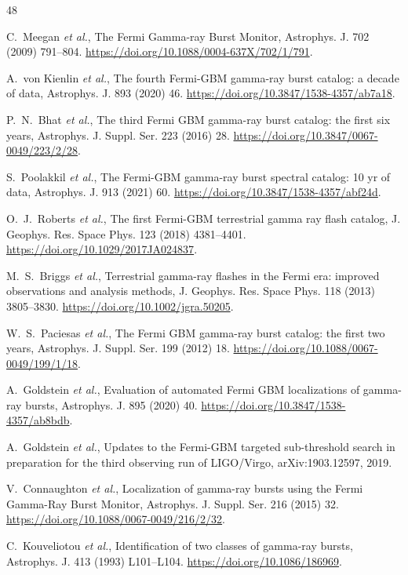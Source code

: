 \documentclass[preprint,12pt]{elsarticle}
\begin{document}

\begin{thebibliography}{48}

 C.~Meegan \textit{et al.}, The Fermi Gamma-ray Burst Monitor, Astrophys. J. 702 (2009) 791--804. \url{https://doi.org/10.1088/0004-637X/702/1/791}.

 A.~von Kienlin \textit{et al.}, The fourth Fermi-GBM gamma-ray burst catalog: a decade of data, Astrophys. J. 893 (2020) 46. \url{https://doi.org/10.3847/1538-4357/ab7a18}.

 P.~N.~Bhat \textit{et al.}, The third Fermi GBM gamma-ray burst catalog: the first six years, Astrophys. J. Suppl. Ser. 223 (2016) 28. \url{https://doi.org/10.3847/0067-0049/223/2/28}.

 S.~Poolakkil \textit{et al.}, The Fermi-GBM gamma-ray burst spectral catalog: 10 yr of data, Astrophys. J. 913 (2021) 60. \url{https://doi.org/10.3847/1538-4357/abf24d}.

 O.~J.~Roberts \textit{et al.}, The first Fermi-GBM terrestrial gamma ray flash catalog, J. Geophys. Res. Space Phys. 123 (2018) 4381--4401. \url{https://doi.org/10.1029/2017JA024837}.

 M.~S.~Briggs \textit{et al.}, Terrestrial gamma-ray flashes in the Fermi era: improved observations and analysis methods, J. Geophys. Res. Space Phys. 118 (2013) 3805--3830. \url{https://doi.org/10.1002/jgra.50205}.

 W.~S.~Paciesas \textit{et al.}, The Fermi GBM gamma-ray burst catalog: the first two years, Astrophys. J. Suppl. Ser. 199 (2012) 18. \url{https://doi.org/10.1088/0067-0049/199/1/18}.

 A.~Goldstein \textit{et al.}, Evaluation of automated Fermi GBM localizations of gamma-ray bursts, Astrophys. J. 895 (2020) 40. \url{https://doi.org/10.3847/1538-4357/ab8bdb}.

 A.~Goldstein \textit{et al.}, Updates to the Fermi-GBM targeted sub-threshold search in preparation for the third observing run of LIGO/Virgo, arXiv:1903.12597, 2019.

 V.~Connaughton \textit{et al.}, Localization of gamma-ray bursts using the Fermi Gamma-Ray Burst Monitor, Astrophys. J. Suppl. Ser. 216 (2015) 32. \url{https://doi.org/10.1088/0067-0049/216/2/32}.

 C.~Kouveliotou \textit{et al.}, Identification of two classes of gamma-ray bursts, Astrophys. J. 413 (1993) L101--L104. \url{https://doi.org/10.1086/186969}.


\end{thebibliography}
\end{document}
